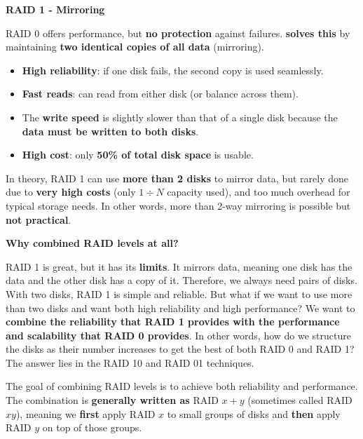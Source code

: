 \begin{center}\label{RAID 1}
    \large
    \hypertarget{RAID 1}{\textcolor{Red2}{\textbf{RAID 1 - Mirroring}}}
\end{center}
RAID 0 offers performance, but \textbf{no protection} against failures. \textbf{ solves this} by maintaining \textbf{two identical copies of all data} (mirroring).
\begin{itemize}
    \item[\textcolor{Green3}{\faIcon{check}}] \textcolor{Green3}{\textbf{High reliability}}: if one disk fails, the second copy is used seamlessly.
    \item[\textcolor{Green3}{\faIcon{check}}] \textcolor{Green3}{\textbf{Fast reads}}: can read from either disk (or balance across them).
    \item[\textcolor{Red2}{\faIcon{exclamation-triangle}}] The \textcolor{Red2}{\textbf{write speed}} is slightly slower than that of a single disk because the \textbf{data must be written to both disks}.
    \item[\textcolor{Red2}{\faIcon{times}}] \textcolor{Red2}{\textbf{High cost}}: only \textbf{50\% of total disk space} is usable.
\end{itemize}
In theory, RAID 1 can use \textbf{more than 2 disks} to mirror data, but rarely done due to \textbf{very high costs} (only $1 \div N$ capacity used), and too much overhead for typical storage needs. In other words, more than 2-way mirroring is possible but \textbf{not practical}.

\highspace
\begin{flushleft}
    \textcolor{Green3}{ \textbf{Why combined RAID levels at all?}}
\end{flushleft}
RAID 1 is great, but it has its \textbf{limits}. It mirrors data, meaning one disk has the data and the other disk has a copy of it. Therefore, we always need pairs of disks. With two disks, RAID 1 is simple and reliable. But what if we want to use more than two disks and want both high reliability and high performance? We want to \textbf{combine the reliability that RAID 1 provides with the performance and scalability that RAID 0 provides}. In other words, how do we structure the disks as their number increases to get the best of both RAID 0 and RAID 1? The answer lies in the RAID 10 and RAID 01 techniques.

\highspace
The goal of combining RAID levels is to achieve both reliability and performance. The combination is \textbf{generally written as} RAID $x+y$ (sometimes called RAID $xy$), meaning we \textbf{first} apply RAID $x$ to small groups of disks and \textbf{then} apply RAID $y$ on top of those groups.

